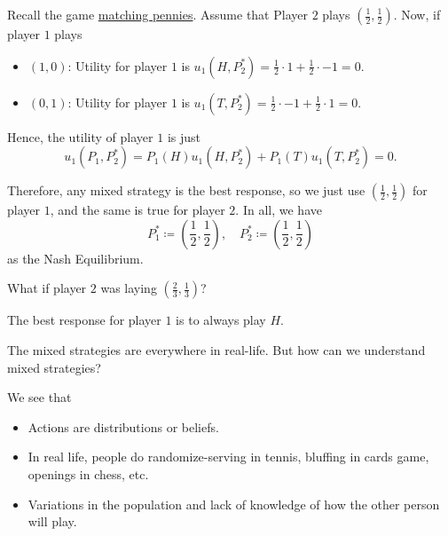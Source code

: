 \begin{prev}
	Recall the game \hyperref[matching-pennies]{matching pennies}. Assume that Player \(2\) plays \((\frac{1}{2}, \frac{1}{2})\).
	Now, if player \(1\) plays
	\begin{itemize}
		\item \((1, 0)\): Utility for player \(1\) is \(u_1(H, P^{\ast}_2) = \frac{1}{2}\cdot 1 + \frac{1}{2}\cdot -1 = 0\).
		\item \((0, 1)\): Utility for player \(1\) is \(u_1(T, P^{\ast}_2) = \frac{1}{2}\cdot -1 + \frac{1}{2}\cdot 1 = 0\).
	\end{itemize}
	Hence, the utility of player \(1\) is just
	\[
		u_1(P_1, P^{\ast}_2) = P_1(H)u_1(H, P^{\ast}_2)+P_1(T)u_1(T, P^{\ast}_2) = 0.
	\]

	Therefore, any mixed strategy is the best response, so we just use \((\frac{1}{2}, \frac{1}{2})\) for player \(1\), and the same is
	true for player \(2\). In all, we have
	\[
		P_1^{\ast}\coloneqq \left(\frac{1}{2}, \frac{1}{2}\right), \quad P_2^{\ast}\coloneqq \left(\frac{1}{2}, \frac{1}{2}\right)
	\]
	as the Nash Equilibrium.

	\begin{problem}
	What if player \(2\) was laying \(\left(\frac{2}{3}, \frac{1}{3}\right)\)?
	\end{problem}
	\begin{answer}
		The best response for player \(1\) is to always play \(H\).
	\end{answer}
\end{prev}

\hr

\begin{problem}
The mixed strategies are everywhere in real-life. But how can we understand mixed strategies?
\end{problem}
\begin{answer}
	We see that
	\begin{itemize}
		\item Actions are distributions or beliefs.
		\item In real life, people do randomize-serving in tennis, bluffing in cards game, openings in chess, etc.
		\item Variations in the population and lack of knowledge of how the other person will play.
	\end{itemize}
\end{answer}

